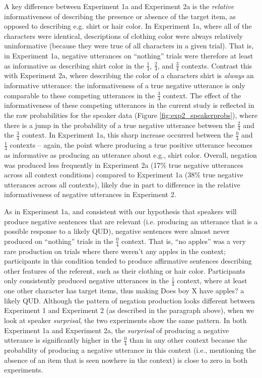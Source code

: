 \documentclass[man, floatsintext, noapacite]{apa6}
\begin{document}
A key difference between Experiment 1a and Experiment 2a is the \textit{relative} informativeness of describing the presence or absence of the target item, as opposed to describing e.g. shirt or hair color. In Experiment 1a, where all of the characters were identical, descriptions of clothing color were always relatively uninformative (because they were true of all characters in a given trial). That is, in Experiment 1a, negative utterances on ``nothing'' trials were therefore at least as informative as describing shirt color in the $\frac{1}{4}$, $\frac{2}{4}$, and $\frac{3}{4}$ contexts. Contrast this with Experiment 2a, where describing the color of a characters shirt is \textit{always} an informative utterance: the informativeness of a true negative utterance is only comparable to these competing utterances in the $\frac{3}{4}$ context. The effect of the informativeness of these competing utterances in the current study is reflected in the raw probabilities for the speaker data (Figure \ref{fig:exp2_speakerprobs}), where there is a jump in the probability of a true negative utterance between the $\frac{2}{4}$ and the $\frac{3}{4}$ context. In Experiment 1a, this sharp increase occurred between the $\frac{0}{4}$ and $\frac{1}{4}$ contexts -- again, the point where producing a true positive utterance becomes as informative as producing an utterance about e.g., shirt color. Overall, negation was produced less frequently in Experiment 2a (17\% true negative utterances across all context conditions) compared to Experiment 1a (38\% true negative utterances across all contexts), likely due in part to difference in the relative informativeness of negative utterances in Experiment 2. 

As in Experiment 1a, and consistent with our hypothesis that speakers will produce negative sentences that are relevant (i.e. producing an utterance that is a possible response to a likely QUD), negative sentences were almost never produced on “nothing” trials in the $\frac{0}{4}$ context. That is, “no apples” was a very rare production on trials where there weren’t any apples in the context; participants in this condition tended to produce affirmative sentences describing other features of the referent, such as their clothing or hair color. Participants only consistently produced negative utterances in the $\frac{1}{4}$ context, where at least one other character has target items, thus making Does boy X have apples? a likely QUD. Although the pattern of negation production looks different between Experiment 1 and Experiment 2 (as described in the paragraph above), when we look at speaker \textit{surprisal}, the two experiments show the same pattern. In both Experiment 1a and Experiment 2a, the \textit{surprisal} of producing a negative utterance is significantly higher in the $\frac{0}{4}$ than in any other context because the probability of producing a negative utterance in this context (i.e., mentioning the absence of an item that is seen nowhere in the context) is close to zero in both experiments. 
\end{document}
